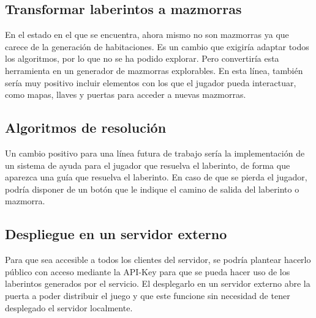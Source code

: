 \subsection{Transformar laberintos a mazmorras}
En el estado en el que se encuentra, ahora mismo no son mazmorras ya que carece de la generación de habitaciones. Es un cambio que exigiría adaptar todos los algoritmos, por lo que no se ha podido explorar. 
Pero convertiría esta herramienta en un generador de mazmorras explorables.
En esta línea, también sería muy positivo incluir elementos con los que el jugador pueda interactuar, como mapas, llaves y puertas para acceder a nuevas mazmorras. 

\subsection{Algoritmos de resolución}
Un cambio positivo para una línea futura de trabajo sería la implementación de un sistema de ayuda para el jugador que resuelva el laberinto, de forma que aparezca una guía que resuelva el laberinto. En caso de que se pierda el jugador, podría disponer de un botón que le indique el camino de salida del laberinto o mazmorra.

\subsection{Despliegue en un servidor externo}
Para que sea accesible a todos los clientes del servidor, se podría plantear hacerlo público con acceso mediante la API-Key para que se pueda hacer uso de los laberintos generados por el servicio. El desplegarlo en un servidor externo abre la puerta a poder distribuir el juego y que este funcione sin necesidad de tener desplegado el servidor localmente.